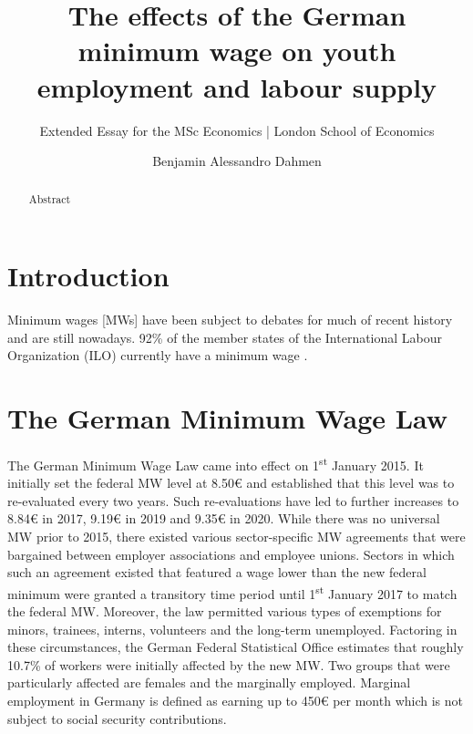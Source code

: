 \documentclass[]{scrartcl}
\title{The effects of the German minimum wage on youth employment and labour supply}
\subtitle{Extended Essay for the MSc Economics | London School of Economics}
\author{Benjamin Alessandro Dahmen}
\date{}
\begin{document}
\maketitle

\begin{abstract}
Abstract
\end{abstract}

\section{Introduction}
Minimum wages [MWs] have been subject to debates for much of recent history and are still nowadays. 92\% of the member states of the International Labour Organization (ILO) currently have a minimum wage \parencite{ILO_MW}.
\section{The German Minimum Wage Law}
The German Minimum Wage Law came into effect on 1\textsuperscript{st} January 2015. It initially set the federal MW level at 8.50€ and established that this level was to re-evaluated every two years. Such re-evaluations have led to further increases to 8.84€ in 2017, 9.19€ in 2019 and 9.35€ in 2020. While there was no universal MW prior to 2015, there existed various sector-specific MW agreements that were bargained between employer associations and employee unions. Sectors in which such an agreement existed that featured a wage lower than the new federal minimum were granted a transitory time period until 1\textsuperscript{st} January 2017 to match the federal MW. Moreover, the law permitted various types of exemptions for minors, trainees, interns, volunteers and the long-term unemployed. Factoring in these circumstances, the German Federal Statistical Office estimates that roughly 10.7\% of workers were initially affected by the new MW. Two groups that were particularly affected are females and the marginally employed. Marginal employment in Germany is defined as earning up to 450€ per month which is not subject to social security contributions.


\printbibliography
\end{document}
